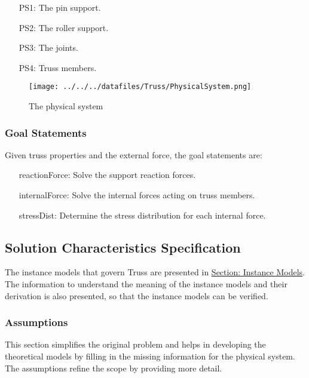 \documentclass[12pt]{article}
\begin{document}
\begin{itemize}
\item[PS1:]{The pin support.}
\item[PS2:]{The roller support.}
\item[PS3:]{The joints.}
\item[PS4:]{Truss members.}
\end{itemize}
\begin{figure}
\begin{center}
\texttt{[image: ../../../datafiles/Truss/PhysicalSystem.png]}
\caption{The physical system}
\label{Figure:physSysImage}
\end{center}
\end{figure}
\subsubsection{Goal Statements}
\label{Sec:GoalStmt}
Given truss properties and the external force, the goal statements are:

\begin{itemize}
\item[reactionForce:\phantomsection\label{reactionForce}]{Solve the support reaction forces.}
\item[internalForce:\phantomsection\label{internalForce}]{Solve the internal forces acting on truss members.}
\item[stressDist:\phantomsection\label{stressDist}]{Determine the stress distribution for each internal force.}
\end{itemize}
\subsection{Solution Characteristics Specification}
\label{Sec:SolCharSpec}
The instance models that govern Truss are presented in \hyperref[Sec:IMs]{Section: Instance Models}. The information to understand the meaning of the instance models and their derivation is also presented, so that the instance models can be verified.

\subsubsection{Assumptions}
\label{Sec:Assumps}
This section simplifies the original problem and helps in developing the theoretical models by filling in the missing information for the physical system. The assumptions refine the scope by providing more detail.
\end{document}
